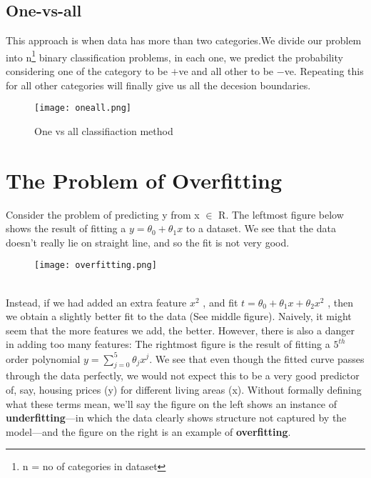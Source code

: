   \subsection{One-vs-all}
    This approach is when data has more than two categories.We divide our problem into n\footnote[1]{n = no of categories in dataset} binary classification problems, in each one, we predict the probability considering one of the category to be $+$ve and all other to be $-$ve. Repeating this for all other categories will finally give us all the decesion boundaries.
    \begin{figure}[h]
      \centering
      \texttt{[image: oneall.png]}
      \caption{One vs all classifiaction method}
    \end{figure}   

\section{The Problem of Overfitting}
  Consider the problem of predicting y from x $\in$ R. The leftmost figure below shows the result of fitting a $y = \theta_0+\theta_1x$ to a dataset. We see that the data doesn’t really lie on straight line, and so the fit is not very good.\\ 
  \begin{figure}[h]
    \centering
    \texttt{[image: overfitting.png]}
  \end{figure}
  \\
  Instead, if we had added an extra feature $x^2$ , and fit $ t = \theta_0 + \theta_1x + \theta_2x^2$ , then we obtain a slightly better fit to the data (See middle figure). Naively, it might seem that the more features we add, the better. However, there is also a danger in adding too many features: The rightmost figure is the result of fitting a $5^{th}$ order polynomial $y = \sum_{j=0} ^5 \theta_j x^j$. We see that even though the fitted curve passes through the data perfectly, we would not expect this to be a very good predictor of, say, housing prices (y) for different living areas (x). Without formally defining what these terms mean, we’ll say the figure on the left shows an instance of \textbf{underfitting}—in which the data clearly shows structure not captured by the model—and the figure on the right is an example of \textbf{overfitting}.

